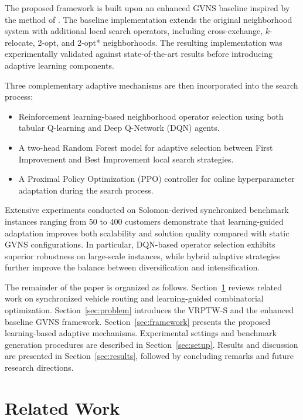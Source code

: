 \documentclass[preprint,12pt]{elsarticle}
\begin{document}
The proposed framework is built upon an enhanced GVNS baseline inspired by the method of \citet{masmoudi2025generalized}. The baseline implementation extends the original neighborhood system with additional local search operators, including cross-exchange, $k$-relocate, 2-opt, and 2-opt* neighborhoods. The resulting implementation was experimentally validated against state-of-the-art results before introducing adaptive learning components.

Three complementary adaptive mechanisms are then incorporated into the search process:
\begin{itemize} 
    \item Reinforcement learning-based neighborhood operator selection using both tabular Q-learning and Deep Q-Network (DQN) agents.
    \item A two-head Random Forest model for adaptive selection between First Improvement and Best Improvement local search strategies.
    \item A Proximal Policy Optimization (PPO) controller for online hyperparameter adaptation during the search process.
\end{itemize}
    
Extensive experiments conducted on Solomon-derived synchronized benchmark instances ranging from 50 to 400 customers demonstrate that learning-guided adaptation improves both scalability and solution quality compared with static GVNS configurations. In particular, DQN-based operator selection exhibits superior robustness on large-scale instances, while hybrid adaptive strategies further improve the balance between diversification and intensification.

The remainder of the paper is organized as follows. Section~\ref{sec:related} reviews related work on synchronized vehicle routing and learning-guided combinatorial optimization. Section~\ref{sec:problem} introduces the VRPTW-S and the enhanced baseline GVNS framework. Section~\ref{sec:framework} presents the proposed learning-based adaptive mechanisms. Experimental settings and benchmark generation procedures are described in Section~\ref{sec:setup}. Results and discussion are presented in Section~\ref{sec:results}, followed by concluding remarks and future research directions.

\section{Related Work}
\label{sec:related}
\end{document}
